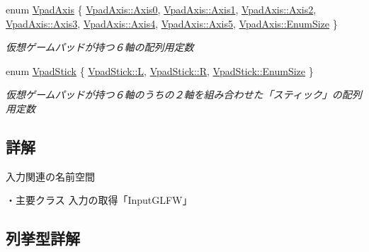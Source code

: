 \begin{DoxyCompactItemize}
enum \mbox{\hyperlink{namespace_k___input_ae7980bb169b8a865a5e67d6fe06fb729}{Vpad\+Axis}} \{ \newline
\mbox{\hyperlink{namespace_k___input_ae7980bb169b8a865a5e67d6fe06fb729a6c870de5687f4ee17425bfa3c253b259}{Vpad\+Axis\+::\+Axis0}}, 
\mbox{\hyperlink{namespace_k___input_ae7980bb169b8a865a5e67d6fe06fb729a5247a5bb0ccea0ec521a5b96ec2282ff}{Vpad\+Axis\+::\+Axis1}}, 
\mbox{\hyperlink{namespace_k___input_ae7980bb169b8a865a5e67d6fe06fb729a297fc5a4ffce7c98e434e4292bcef97e}{Vpad\+Axis\+::\+Axis2}}, 
\mbox{\hyperlink{namespace_k___input_ae7980bb169b8a865a5e67d6fe06fb729ad2294667d8b7761f6f0b5f60ca86768c}{Vpad\+Axis\+::\+Axis3}}, 
\newline
\mbox{\hyperlink{namespace_k___input_ae7980bb169b8a865a5e67d6fe06fb729a3133c9542e780061be2699d3db0eaf4a}{Vpad\+Axis\+::\+Axis4}}, 
\mbox{\hyperlink{namespace_k___input_ae7980bb169b8a865a5e67d6fe06fb729a5556e61cbc0ac05dba289b93dfb86bd8}{Vpad\+Axis\+::\+Axis5}}, 
\mbox{\hyperlink{namespace_k___input_ae7980bb169b8a865a5e67d6fe06fb729a1831c6ae7202fe5c450ac301df5245a0}{Vpad\+Axis\+::\+Enum\+Size}}
 \}
\begin{DoxyCompactList}\small\item\em 仮想ゲームパッドが持つ６軸の配列用定数 \end{DoxyCompactList}\item 
enum \mbox{\hyperlink{namespace_k___input_a18bb7eb174cac2fd54b7a5b0d02a0116}{Vpad\+Stick}} \{ \mbox{\hyperlink{namespace_k___input_a18bb7eb174cac2fd54b7a5b0d02a0116ad20caec3b48a1eef164cb4ca81ba2587}{Vpad\+Stick\+::L}}, 
\mbox{\hyperlink{namespace_k___input_a18bb7eb174cac2fd54b7a5b0d02a0116ae1e1d3d40573127e9ee0480caf1283d6}{Vpad\+Stick\+::R}}, 
\mbox{\hyperlink{namespace_k___input_a18bb7eb174cac2fd54b7a5b0d02a0116a1831c6ae7202fe5c450ac301df5245a0}{Vpad\+Stick\+::\+Enum\+Size}}
 \}
\begin{DoxyCompactList}\small\item\em 仮想ゲームパッドが持つ６軸のうちの２軸を組み合わせた「スティック」の配列用定数 \end{DoxyCompactList}\end{DoxyCompactItemize}


\subsection{詳解}
入力関連の名前空間 

・主要クラス 入力の取得「\+Input\+G\+L\+F\+W」 

\subsection{列挙型詳解}
\mbox{\label{namespace_k___input_a82230ae06723a21cc710ae3d66fd078f}} 
